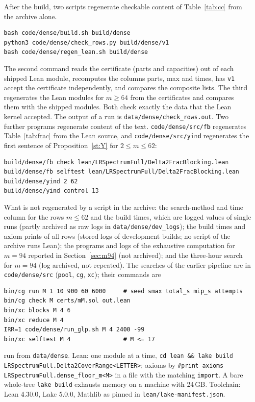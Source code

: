 \documentclass[11pt]{article}
\theoremstyle{remark}
\begin{document}
After the build, two scripts regenerate checkable content of Table~\ref{tab:cc} from the archive alone.
\begin{verbatim}
bash code/dense/build.sh build/dense
python3 code/dense/check_rows.py build/dense/v1
bash code/dense/regen_lean.sh build/dense
\end{verbatim}
The second command reads the certificate (parts and capacities) out of each shipped Lean module, recomputes the columns parts, max and times, has \texttt{v1} accept the certificate independently, and compares the composite lists. The third regenerates the Lean modules for $m\ge64$ from the certificates and compares them with the shipped modules. Both check exactly the data that the Lean kernel accepted. The output of a run is \texttt{data/dense/check\_rows.out}.
Two further programs regenerate content of the text. \texttt{code/dense/src/fb} regenerates Table~\ref{tab:frac} from the Lean source, and \texttt{code/dense/src/yind} regenerates the first sentence of Proposition~\ref{st:Y} for $2\le m\le62$:
\begin{verbatim}
build/dense/fb check lean/LRSpectrumFull/Delta2FracBlocking.lean
build/dense/fb selftest lean/LRSpectrumFull/Delta2FracBlocking.lean
build/dense/yind 2 62
build/dense/yind control 13
\end{verbatim}
What is not regenerated by a script in the archive: the search-method and time column for the rows $m\le62$ and the build times, which are logged values of single runs (partly archived as raw logs in \texttt{data/dense/dev\_logs}); the build times and axiom prints of all rows (stored logs of development builds; no script of the archive runs Lean); the programs and logs of the exhaustive computation for $m=94$ reported in Section~\ref{sec:m94} (not archived); and the three-hour search for $m=94$ (log archived, not repeated). The searches of the earlier pipeline are in \texttt{code/dense/src} (\texttt{pool}, \texttt{cg}, \texttt{xc}); their commands are
\begin{verbatim}
bin/cg run M 1 10 900 60 6000     # seed smax total_s mip_s attempts
bin/cg check M certs/mM.sol out.lean
bin/xc blocks M 4 6
bin/xc reduce M 4
IRR=1 code/dense/run_glp.sh M 4 2400 -99
bin/xc selftest M 4               # M <= 17
\end{verbatim}
run from \texttt{data/dense}. Lean: one module at a time, \texttt{cd lean \&\& lake build LRSpectrumFull.Delta2CoverRange<LETTER>}; axioms by \texttt{\#print axioms LRSpectrumFull.dense\_floor\_m<M>} in a file with the matching \texttt{import}. A bare whole-tree \texttt{lake build} exhausts memory on a machine with 24\,GB. Toolchain: Lean 4.30.0, Lake 5.0.0, Mathlib as pinned in \texttt{lean/lake-manifest.json}.
\end{document}
